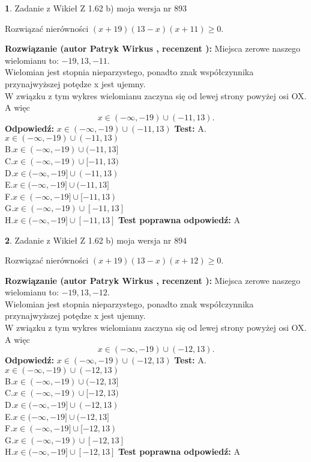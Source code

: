 \documentclass[12pt, a4paper]{article}
\theoremstyle{definition} %
\newtheorem{zad}{}
\newcommand{\zadStart}[1]{\begin{zad}#1\newline}
\newcommand{\zadStop}{\end{zad}}
\newcommand{\rozwStart}[2]{\noindent \textbf{Rozwiązanie (autor #1 , recenzent #2): }\newline}
\newcommand{\rozwStop}{\newline}
\newcommand{\odpStart}{\noindent \textbf{Odpowiedź:}\newline}
\newcommand{\odpStop}{\newline}
\newcommand{\testStart}{\noindent \textbf{Test:}\newline}
\newcommand{\testStop}{\newline}
\newcommand{\kluczStart}{\noindent \textbf{Test poprawna odpowiedź:}\newline}
\newcommand{\kluczStop}{\newline}
\begin{document}
\zadStart{Zadanie z Wikieł Z 1.62 b) moja wersja nr 893}

Rozwiązać nierówności $(x+19)(13-x)(x+11)\ge0$.
\zadStop
\rozwStart{Patryk Wirkus}{}
Miejsca zerowe naszego wielomianu to: $-19, 13, -11$.\\
Wielomian jest stopnia nieparzystego, ponadto znak współczynnika przy\linebreak najwyższej potędze x jest ujemny.\\ W związku z tym wykres wielomianu zaczyna się od lewej strony powyżej osi OX. A więc $$x \in (-\infty,-19) \cup (-11,13).$$
\rozwStop
\odpStart
$x \in (-\infty,-19) \cup (-11,13)$
\odpStop
\testStart
A.$x \in (-\infty,-19) \cup (-11,13)$\\
B.$x \in (-\infty,-19) \cup (-11,13]$\\
C.$x \in (-\infty,-19) \cup [-11,13)$\\
D.$x \in (-\infty,-19] \cup (-11,13)$\\
E.$x \in (-\infty,-19] \cup (-11,13]$\\
F.$x \in (-\infty,-19] \cup [-11,13)$\\
G.$x \in (-\infty,-19) \cup [-11,13]$\\
H.$x \in (-\infty,-19] \cup [-11,13]$
\testStop
\kluczStart
A
\kluczStop



\zadStart{Zadanie z Wikieł Z 1.62 b) moja wersja nr 894}

Rozwiązać nierówności $(x+19)(13-x)(x+12)\ge0$.
\zadStop
\rozwStart{Patryk Wirkus}{}
Miejsca zerowe naszego wielomianu to: $-19, 13, -12$.\\
Wielomian jest stopnia nieparzystego, ponadto znak współczynnika przy\linebreak najwyższej potędze x jest ujemny.\\ W związku z tym wykres wielomianu zaczyna się od lewej strony powyżej osi OX. A więc $$x \in (-\infty,-19) \cup (-12,13).$$
\rozwStop
\odpStart
$x \in (-\infty,-19) \cup (-12,13)$
\odpStop
\testStart
A.$x \in (-\infty,-19) \cup (-12,13)$\\
B.$x \in (-\infty,-19) \cup (-12,13]$\\
C.$x \in (-\infty,-19) \cup [-12,13)$\\
D.$x \in (-\infty,-19] \cup (-12,13)$\\
E.$x \in (-\infty,-19] \cup (-12,13]$\\
F.$x \in (-\infty,-19] \cup [-12,13)$\\
G.$x \in (-\infty,-19) \cup [-12,13]$\\
H.$x \in (-\infty,-19] \cup [-12,13]$
\testStop
\kluczStart
A
\kluczStop
\end{document}
